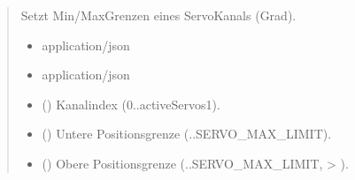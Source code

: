 \documentclass[letterpaper,10pt,english]{sphinxmanual}
\begin{document}
\begin{fulllineitems}
\label{\detokenize{agv_rest_api_pwm:post--api-agv-pwm-channel-setLimits}}
\pysigstartsignatures
\pysigline
{}
\pysigstopsignatures\begin{quote}\begin{description}
\sphinxAtStartPar
Setzt Min\sphinxhyphen{}/Max\sphinxhyphen{}Grenzen eines Servo\sphinxhyphen{}Kanals (Grad).

\begin{itemize}
\item {} 
\sphinxAtStartPar
{} \textendash{} application/json

\end{itemize}

\begin{itemize}
\item {} 
\sphinxAtStartPar
{} \textendash{} application/json

\end{itemize}

\begin{itemize}
\item {} 
\sphinxAtStartPar
{} () \textendash{} Kanalindex (0..\textasciigrave{}activeServos\sphinxhyphen{}1\textasciigrave{}).

\item {} 
\sphinxAtStartPar
{} () \textendash{} Untere Positionsgrenze (..\textasciigrave{}\textasciigrave{}SERVO\_MAX\_LIMIT\textasciigrave{}\textasciigrave{}).

\item {} 
\sphinxAtStartPar
{} () \textendash{} Obere Positionsgrenze (..\textasciigrave{}\textasciigrave{}SERVO\_MAX\_LIMIT\textasciigrave{}\textasciigrave{}, \textgreater{} ).


\end{itemize}
\end{description}
\end{quote}
\end{fulllineitems}
\end{document}
